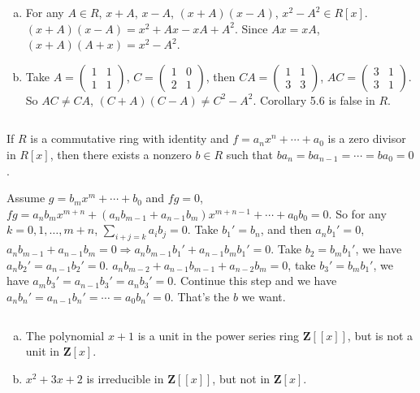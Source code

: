 \begin{answer}
    \begin{enumerate}[(a)]
        \item For any $A\in R$, $x+A$, $x-A$, $(x+A)(x-A)$, $x^{2}-A^{2}\in R[x]$. $(x+A)(x-A)=x^{2}+Ax-xA+A^{2}$. Since $Ax=xA$, $(x+A)(A+x)=x^{2}-A^{2}$.
        \item Take $A=\begin{pmatrix}
            1&1\\1&1
        \end{pmatrix}$, $C=\begin{pmatrix}
            1&0\\2&1
        \end{pmatrix}$, then $CA=\begin{pmatrix}
            1&1\\3&3
        \end{pmatrix}$, $AC=\begin{pmatrix}
            3&1\\3&1
        \end{pmatrix}$. So $AC\neq CA$, $(C+A)(C-A)\neq C^{2}-A^{2}$. Corollary 5.6 is false in $R$.
    \end{enumerate}
\end{answer}

$$ $$

\begin{ex}
    If $R$ is a commutative ring with identity and $f=a_{n}x^{n}+\cdots+a_{0}$ is a zero divisor in $R[x]$, then there exists a nonzero $b\in R$ such that $ba_{n}=ba_{n-1}=\cdots=ba_{0}=0$.
\end{ex}

\begin{answer}
    Assume $g=b_{m}x^{m}+\cdots+b_{0}$ and $fg=0$, $fg=a_{n}b_{m}x^{m+n}+(a_{n}b_{m-1}+a_{n-1}b_{m})x^{m+n-1}+\cdots+a_{0}b_{0}=0$. So for any $k=0,1,\dots,m+n$, $\sum\limits_{i+j=k}a_{i}b_{j}=0$. Take $b_{1}'=b_{n}$, and then $a_{n}b_{1}'=0$, $a_{n}b_{m-1}+a_{n-1}b_{m}=0\Rightarrow a_{n}b_{m-1}b_{1}'+a_{n-1}b_{m}b_{1}'=0$. Take $b_{2}=b_{m}b_{1}'$, we have $a_{n}b_{2}'=a_{n-1}b_{2}'=0$. $a_{n}b_{m-2}+a_{n-1}b_{m-1}+a_{n-2}b_{m}=0$, take $b_{3}'=b_{m}b_{1}'$, we have $a_{m}b_{3}'=a_{n-1}b_{3}'=a_{n}b_{3}'=0$. Continue this step and we have $a_{n}b_{n}'=a_{n-1}b_{n}'=\cdots= a_{0}b_{n}'=0$. That's the $b$ we want.
\end{answer}

$$ $$

\begin{ex}
    \begin{enumerate}[(a)]
        \item The polynomial $x+1$ is a unit in the power series ring $\mathbf{Z}[[x]]$, but is not a unit in $\mathbf{Z}[x]$.
        \item $x^{2}+3x+2$ is irreducible in $\mathbf{Z}[[x]]$, but not in $\mathbf{Z}[x]$.
    \end{enumerate}
\end{ex}

